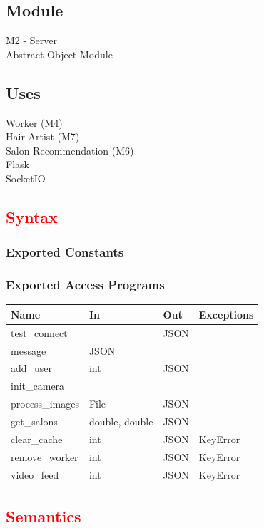 \documentclass[12pt, titlepage]{article}
\begin{document}
\subsection{Module}
M2 - Server\\
Abstract Object Module

\subsection{Uses}
Worker (M4) \\
Hair Artist (M7) \\
Salon Recommendation (M6) \\
Flask \\
SocketIO 

\subsection{\textcolor{red}{Syntax}}

\subsubsection{Exported Constants}
\subsubsection{Exported Access Programs}

\begin{center}
\begin{tabular}{p{4cm} p{3cm} p{4cm} p{4cm}}
\hline
\textbf{Name} & \textbf{In} & \textbf{Out} & \textbf{Exceptions} \\
\hline
test\_connect &  & JSON & \\
message & JSON &  &  \\
add\_user & int & JSON & \\
init\_camera &  &  & \\
process\_images & File & JSON & \\
get\_salons & double, double & JSON & \\
clear\_cache & int & JSON & KeyError\\
remove\_worker & int & JSON & KeyError\\
video\_feed & int & JSON & KeyError\\
\hline
\end{tabular}
\end{center}

\subsection{\textcolor{red}{Semantics}}
\end{document}
